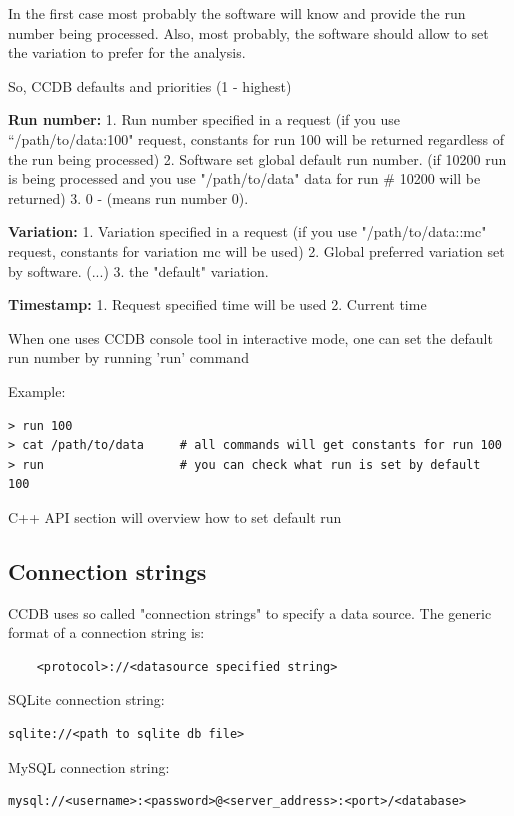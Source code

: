\documentclass{article}
\begin{document}
In the first case most probably the software will know and provide the run
number being processed. Also, most probably, the software should allow to set
the variation to prefer for the analysis.

So, CCDB defaults and priorities (1 - highest)

\textbf{Run number:}
1. Run number specified in a request
(if you use ``/path/to/data:100" request, constants for run 100 will be returned
regardless of the run being processed)
2. Software set global default run number.
(if 10200 run is being processed and you use "/path/to/data" data for run \#
 10200 will be returned)
3. 0 - (means run number 0).

\textbf{Variation:}
1. Variation specified in a request
(if you use "/path/to/data::mc" request, constants for variation mc will be used)
2. Global preferred variation set by software.
(...)
3. the "default" variation.


\textbf{Timestamp:}
1. Request specified time will be used
2. Current time

When one uses CCDB console tool in interactive mode, one can set the default run number by running 'run' command

Example:
\begin{verbatim}
> run 100
> cat /path/to/data     # all commands will get constants for run 100
> run                   # you can check what run is set by default
100
\end{verbatim}
C++ API section will overview how to set default run


\subsection{Connection strings}\label{sec:connection}


CCDB uses so called "connection strings" to specify a data source.
The generic format of a connection string is:
\begin{verbatim}
    <protocol>://<datasource specified string>
\end{verbatim}

SQLite connection string:
\begin{verbatim}
sqlite://<path to sqlite db file>
\end{verbatim}

MySQL connection string:
\begin{verbatim}
mysql://<username>:<password>@<server_address>:<port>/<database>
\end{verbatim}
\end{document}
